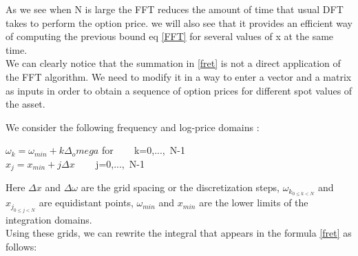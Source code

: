 \documentclass[12pt]{report}
\begin{document}
 As we see when N is large the FFT reduces the amount of time that usual DFT takes to perform the option price. we will also see that it provides an efficient way of computing the previous bound eq \eqref{FFT} for several values of x at the same time.\\

 We can clearly notice that the summation in \eqref{fret} is not a direct application of the FFT algorithm. We need to modify it in a way to enter a vector and a matrix  as inputs in order to obtain a sequence of option prices for different spot values of the asset. 

We consider the following frequency and log-price domains :
\begin{center}
$\omega_k=\omega_{min}+k\Delta _omega$ for ~~~ k=0,...,~N-1\\
$x_j=x_{min}+j\Delta x$ ~~~ j=0,...,~N-1
\end{center}

Here $\Delta x$ and $\Delta \omega$ are the grid spacing or the discretization steps,    $\omega_{k_{0\leq k <N }}$ and $x_{j_{0\leq j <N }}$ are 
equidistant points, $\omega_{min}$ and $x_{min}$ are the lower limits of the integration domains.\\

Using these grids, we can rewrite the integral that appears in the formula \eqref{fret} as follows:
\end{document}
